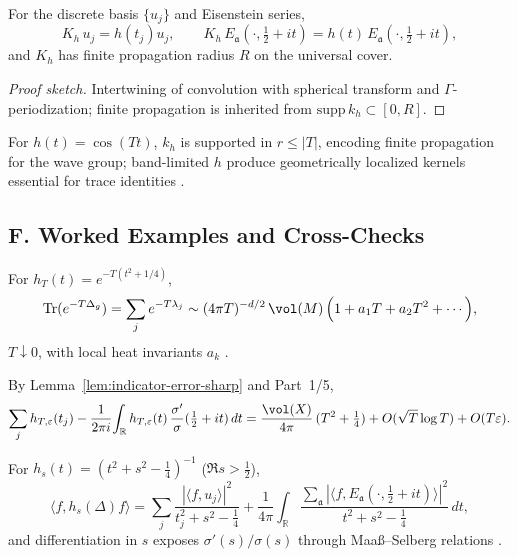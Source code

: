 \begin{theorem}
\label{thm:Kh-action-sharp}
For the discrete basis $\{u_j\}$ and Eisenstein series,
\[
  K_h\,u_j=h(t_j)u_j,\qquad
  K_h\,E_{\mathfrak a}(\cdot,\tfrac12+it)=h(t)\,E_{\mathfrak a}(\cdot,\tfrac12+it),
\]
and $K_h$ has finite propagation radius $R$ on the universal cover.
\end{theorem}

\begin{proof}[Proof sketch]
Intertwining of convolution with spherical transform and $\Gamma$-periodization; finite propagation is inherited from $\mathrm{supp}\,k_h\subset[0,R]$.
\end{proof}

\begin{remark}
For $h(t)=\cos(Tt)$, $k_h$ is supported in $r\le|T|$, encoding finite propagation for the wave group; band-limited $h$ produce geometrically localized kernels essential for trace identities \cite{Selberg1956,Hejhal1983}.
\end{remark}


\subsection*{F. Worked Examples and Cross-Checks}
\label{subsec:examples-probes-sharp}

\begin{example}
For $h_T(t)=e^{-T(t^2+1/4)}$,
\[
  \mathrm{Tr}(e^{-T\Delta_g})
  =\sum_j e^{-T\lambda_j}
  \sim (4\pi T)^{-d/2}\,\vol(M)\,\Big(1+a_1 T+a_2 T^2+\cdots\Big),
\]
$T\downarrow0$, with local heat invariants $a_k$ \cite{Minakshisundaram1949,Seeley1967}.
\end{example}

\begin{example}
By Lemma~\ref{lem:indicator-error-sharp} and Part~1/5,
\[
  \sum_j h_{T,\varepsilon}(t_j)-\frac{1}{2\pi i}\!\int_{\mathbb R} h_{T,\varepsilon}(t)\,\frac{\sigma'}{\sigma}(\tfrac12+it)\,dt
  =\frac{\vol(X)}{4\pi}\,(T^2+\tfrac14) + O(\sqrt{T}\log T)+O(T\varepsilon).
\]
\end{example}

\begin{example}
For $h_s(t)=(t^2+s^2-\tfrac14)^{-1}$ ($\Re s>\tfrac12$),
\[
  \langle f,h_s(\Delta)f\rangle
  =\sum_j \frac{|\langle f,u_j\rangle|^2}{t_j^2+s^2-\tfrac14}
   +\frac{1}{4\pi}\int_{\mathbb R}\frac{\sum_{\mathfrak a}|\langle f,E_{\mathfrak a}(\cdot,\tfrac12+it)\rangle|^2}{t^2+s^2-\tfrac14}\,dt,
\]
and differentiation in $s$ exposes $\sigma'(s)/\sigma(s)$ through Maaß–Selberg relations \cite{LaxPhillips1976,Hejhal1983II}.
\end{example}

